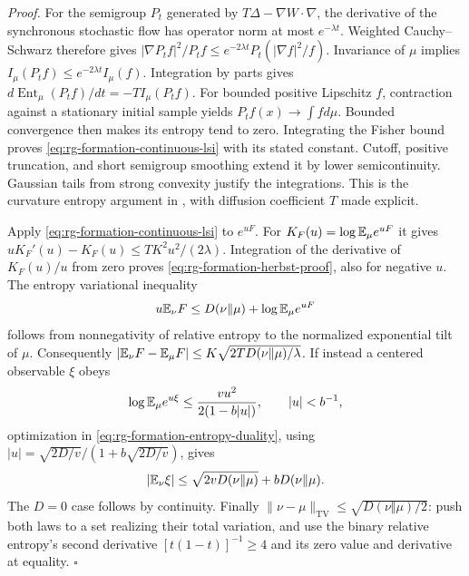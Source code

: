 \emph{Proof.}
For the semigroup $P_t$ generated by $T\Delta-\nabla W\cdot\nabla$,
the derivative of the synchronous stochastic flow has operator norm
at most $e^{-\lambda t}$. Weighted Cauchy--Schwarz therefore gives
$|\nabla P_tf|^2/P_tf\le e^{-2\lambda t}
P_t(|\nabla f|^2/f)$. Invariance of $\mu$ implies
$I_\mu(P_tf)\le e^{-2\lambda t}I_\mu(f)$.
Integration by parts gives
$d\operatorname{Ent}_\mu(P_tf)/dt=-TI_\mu(P_tf)$.
For bounded positive Lipschitz $f$, contraction against a stationary
initial sample yields $P_tf(x)\to\int f d\mu$. Bounded convergence
then makes its entropy tend to zero. Integrating the Fisher bound
proves \cref{eq:rg-formation-continuous-lsi} with its stated constant.
Cutoff, positive truncation, and short semigroup smoothing extend it
by lower semicontinuity. Gaussian tails from strong convexity justify
the integrations. This is the curvature entropy argument in
\citet[pp.~187, 194--200]{BakryEmery1985}, with diffusion coefficient
$T$ made explicit.

Apply \cref{eq:rg-formation-continuous-lsi} to $e^{uF}$.
For $K_F(u)=\log\mathbb E_\mu e^{uF}$ it gives
$uK_F'(u)-K_F(u)\le TK^2u^2/(2\lambda)$.
Integration of the derivative of $K_F(u)/u$ from zero proves
\cref{eq:rg-formation-herbst-proof}, also for negative $u$.
The entropy variational inequality
\begin{equation}
 u\mathbb E_\nu F\le D(\nu\Vert\mu)+\log\mathbb E_\mu e^{uF}
 \label{eq:rg-formation-entropy-duality}
\end{equation}
follows from nonnegativity of relative entropy to the normalized
exponential tilt of $\mu$. Consequently
$|\mathbb E_\nu F-\mathbb E_\mu F|\le K\sqrt{2TD(\nu\Vert\mu)/\lambda}$.
If instead a centered observable $\xi$ obeys
\begin{equation}
 \log\mathbb E_\mu e^{u\xi}\le
       \frac{v u^2}{2(1-b|u|)},\qquad |u|<b^{-1},
 \label{eq:rg-formation-subgamma-proof}
\end{equation}
optimization in \cref{eq:rg-formation-entropy-duality}, using
$|u|=\sqrt{2D/v}/(1+b\sqrt{2D/v})$, gives
\begin{equation}
 |\mathbb E_\nu\xi|
 \le\sqrt{2vD(\nu\Vert\mu)}+bD(\nu\Vert\mu).
 \label{eq:rg-formation-score-duality}
\end{equation}
The $D=0$ case follows by continuity. Finally
$\|\nu-\mu\|_{\mathrm{TV}}\le\sqrt{D(\nu\Vert\mu)/2}$:
push both laws to a set realizing their total variation, and use
the binary relative entropy's second derivative
$[t(1-t)]^{-1}\ge4$ and its zero value and derivative at equality.
\hfill$\square$

